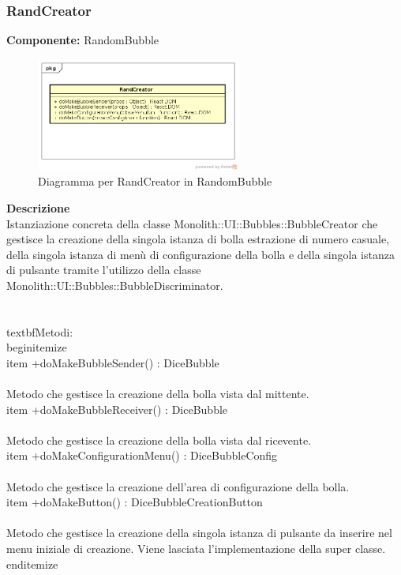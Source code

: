 \subsubsection{RandCreator}
\textbf{Componente:}  RandomBubble\\
   \FloatBarrier
   \begin{figure}[ht]
   \centering
   \includegraphics[width=0.6\textwidth]{img/single-RandCreator}
   \caption{{Diagramma per RandCreator in RandomBubble}}
\end{figure}
\FloatBarrier
\textbf{Descrizione}\\
Istanziazione concreta della classe Monolith::UI::Bubbles::BubbleCreator che gestisce la creazione della singola istanza di bolla estrazione di numero casuale, della singola istanza di menù di configurazione della bolla e della singola istanza di pulsante tramite l'utilizzo della classe Monolith::UI::Bubbles::BubbleDiscriminator.
\\\\
\\textbf{Metodi:} 
\\begin{itemize}
\\item +doMakeBubbleSender() : DiceBubble 
\\\\
Metodo che gestisce la creazione della bolla vista dal mittente.
\\item +doMakeBubbleReceiver() : DiceBubble 
\\\\
Metodo che gestisce la creazione della bolla vista dal ricevente.
\\item +doMakeConfigurationMenu() : DiceBubbleConfig 
\\\\
Metodo che gestisce la creazione dell'area di configurazione della bolla.
\\item +doMakeButton() : DiceBubbleCreationButton 
\\\\
Metodo che gestisce la creazione della singola istanza di pulsante da inserire nel menu iniziale di creazione. Viene lasciata l'implementazione della super classe.
\\end{itemize} 


